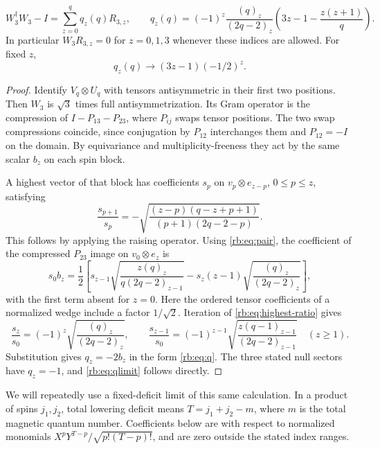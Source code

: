 \begin{lemma}\label{rb:lem:q}
\begin{equation}\label{rb:eq:q}
 W_3^\dagger W_3-I=\sum_{z=0}^q q_z(q)R_{3,z},\qquad
 q_z(q)=(-1)^z\frac{(q)_z}{(2q-2)_z}
          \left(3z-1-\frac{z(z+1)}q\right).
\end{equation}
In particular $W_3R_{3,z}=0$ for $z=0,1,3$ whenever these indices are allowed. For fixed $z$,
\begin{equation}\label{rb:eq:qlimit}
 q_z(q)\longrightarrow (3z-1)(-1/2)^z.
\end{equation}
\end{lemma}
\begin{proof}
Identify $V_q\otimes U_q$ with tensors antisymmetric in their first two positions. Then $W_3$ is $\sqrt3$ times full antisymmetrization. Its Gram operator is the compression of $I-P_{13}-P_{23}$, where $P_{ij}$ swaps tensor positions. The two swap compressions coincide, since conjugation by $P_{12}$ interchanges them and $P_{12}=-I$ on the domain. By equivariance and multiplicity-freeness they act by the same scalar $b_z$ on each spin block.

A highest vector of that block has coefficients $s_p$ on $v_p\otimes e_{z-p}$, $0\le p\le z$, satisfying
\begin{equation}\label{rb:eq:highest-ratio}
 \frac{s_{p+1}}{s_p}=-\sqrt{\frac{(z-p)(q-z+p+1)}{(p+1)(2q-2-p)}}.
\end{equation}
This follows by applying the raising operator. Using \eqref{rb:eq:pair}, the coefficient of the compressed $P_{23}$ image on $v_0\otimes e_z$ is
\[
 s_0b_z=\frac12\left[
 s_{z-1}\sqrt{\frac{z(q)_z}{q(2q-2)_{z-1}}}
 -s_z(z-1)\sqrt{\frac{(q)_z}{(2q-2)_z}}\right],
\]
with the first term absent for $z=0$. Here the ordered tensor coefficients of a normalized wedge include a factor $1/\sqrt2$. Iteration of \eqref{rb:eq:highest-ratio} gives
\[
 \frac{s_z}{s_0}=(-1)^z\sqrt{\frac{(q)_z}{(2q-2)_z}},\qquad
 \frac{s_{z-1}}{s_0}=(-1)^{z-1}
 \sqrt{\frac{z(q-1)_{z-1}}{(2q-2)_{z-1}}}\quad(z\ge1).
\]
Substitution gives $q_z=-2b_z$ in the form \eqref{rb:eq:q}. The three stated null sectors have $q_z=-1$, and \eqref{rb:eq:qlimit} follows directly.
\end{proof}

We will repeatedly use a fixed-deficit limit of this same calculation. In a product of spins $j_1,j_2$, total lowering deficit means $T=j_1+j_2-m$, where $m$ is the total magnetic quantum number. Coefficients below are with respect to normalized monomials $X^pY^{T-p}/\sqrt{p!(T-p)!}$, and are zero outside the stated index ranges.

